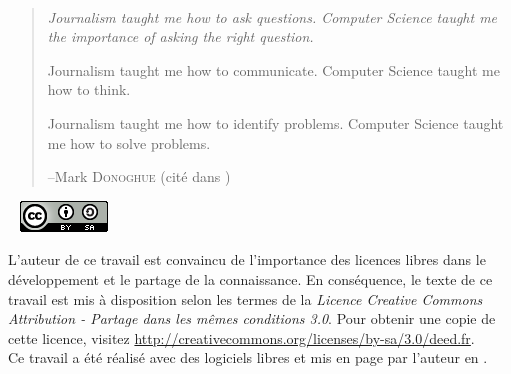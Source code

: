 
~ \vfill

\begin{quote}
\og \em Journalism taught me how to ask questions. Computer Science taught me the importance 
of asking the right question.

Journalism taught me how to communicate. Computer Science taught me how to think.

Journalism taught me how to identify problems. Computer Science taught me how to solve problems.\em \fg

--Mark \textsc{Donoghue} (cité dans \cite{bradshaw})
\end{quote}


~ \vfill
\noindent \includegraphics[]{img/cc-by-sa.png}

\footnotesize
\noindent L'auteur de ce travail est convaincu de l'importance des licences libres dans
le développement et le partage de la connaissance.
En conséquence, le texte de ce travail est mis à disposition selon les termes 
de la \emph{Licence Creative Commons Attribution - Partage dans les mêmes 
conditions 3.0}. Pour obtenir une copie de cette licence, visitez  
\url{http://creativecommons.org/licenses/by-sa/3.0/deed.fr}.
\\ 

\noindent Ce travail a été réalisé avec des logiciels libres et mis en page par 
l'auteur en \LaTeXe.
\normalsize
\thispagestyle{empty}
